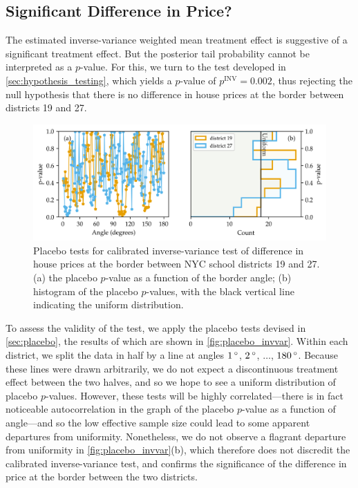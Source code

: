 \documentclass[12pt]{article}
\begin{document}
\subsection{Significant Difference in Price?}
The estimated inverse-variance weighted mean treatment effect is suggestive of a significant treatment effect.
But the posterior tail probability cannot be interpreted as a \(p\)-value.
For this, we turn to the test developed in \autoref{sec:hypothesis_testing}, which yields a \(p\)-value of \(p^{\mathrm{INV}}=0.002\), thus rejecting the null hypothesis that there is no difference in house prices at the border between districts 19 and 27.

\begin{figure}[tb]
    \centering
    \includegraphics[width=\textwidth,height=0.3\textheight,keepaspectratio]{../NYC/NYC_plots/placebo_invvar.png}
    \caption{\label{fig:placebo_invvar} Placebo tests for calibrated inverse-variance test of difference in house prices at the border between NYC school districts 19 and 27. 
    (a) the placebo \(p\)-value as a function of the border angle;
    (b) histogram of the placebo \(p\)-values, with the black vertical line indicating the uniform distribution.}
\end{figure}

To assess the validity of the test, we apply the placebo tests devised in \autoref{sec:placebo},
the results of which are shown in \autoref{fig:placebo_invvar}.
Within each district, we split the data in half by a line at angles \(1{\,^\circ}\), \(2{\,^\circ}\), \(\dotsc\), \(180{\,^\circ}\).
Because these lines were drawn arbitrarily, we do not expect a discontinuous treatment effect between the two halves, and so we hope to see a uniform distribution of placebo \(p\)-values.
However, these tests will be highly correlated---there is in fact noticeable autocorrelation in the graph of the placebo \(p\)-value as a function of angle---and so the low effective sample size could lead to some apparent departures from uniformity.
Nonetheless, we do not observe a flagrant departure from uniformity in \autoref{fig:placebo_invvar}(b), which therefore does not discredit the calibrated inverse-variance test, and confirms the significance of the difference in price at the border between the two districts.
\end{document}

